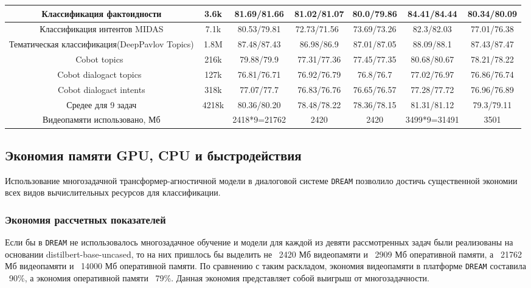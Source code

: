 \begin{table}[htbp]
{\begin{tabular}{|c||c|c|c|c|c|c|}
Классификация фактоидности                      & 3.6k  & 81.69/81.66  & 81.02/81.07  & 80.0/79.86                   & 84.41/84.44  & 80.34/80.09 \\ \hline
Классификация интентов MIDAS                    & 7.1k  & 80.53/79.81  & 72.73/71.56~ & 73.69/73.26 & 82.3/82.03   & 77.01/76.38 \\ \hline
Тематическая классификация(DeepPavlov Topics) & 1.8M  & 87.48/87.43  & 86.98/86.9   & 87.01/87.05                  & 88.09/88.1   & 87.43/87.47 \\ \hline
Cobot topics~                                   & 216k  & 79.88/79.9   & 77.31/77.36  & 77.45/77.35                  & 80.68/80.67  & 78.21/78.22 \\ \hline
Cobot dialogact topics~                         & 127k  & 76.81/76.71  & 76.92/76.79  & 76.8/76.7                    & 77.02/76.97  & 76.86/76.74 \\ \hline
Cobot dialogact intents                         & 318k  & 77.07/77.7   & 76.83/76.76  & 76.65/76.57                  & 77.28/77.72  & 76.96/76.89 \\ \hline
Средее для 9 задач                                     & 4218k & 80.36/80.20       & 78.48/78.22  & 78.36/78.15                  & 81.31/81.12    & 79.3/79.11  \\ \hline
Видеопамяти использовано, Мб                             &       & 2418*9=21762 & 2420         & 2420                         & 3499*9=31491 & 3501        \\ \hline
\end{tabular}
}
\end{table}

\subsection{Экономия памяти GPU, CPU и быстродействия} 
\label{economy}
Использование многозадачной трансформер-агностичной модели в диалоговой системе \texttt{DREAM} позволило достичь существенной экономии всех видов вычислительных ресурсов для классификации.
\subsubsection{Экономия рассчетных показателей} 
\label{economy_predicted} 
 Если бы в \texttt{DREAM} не использовалось многозадачное обучение и модели для каждой из девяти рассмотренных задач были реализованы на основании  distilbert-base-uncased, то на них пришлось бы выделить не ~2420 Мб видеопамяти и ~2909 Мб оперативной памяти, а ~21762 Мб видеопамяти и ~14000 Мб оперативной памяти. По сравнению с таким раскладом, экономия видеопамяти в платформе \texttt{DREAM} составила ~90\%, а экономия оперативной памяти ~79\%. Данная экономия представляет собой выигрыш от многозадачности.


